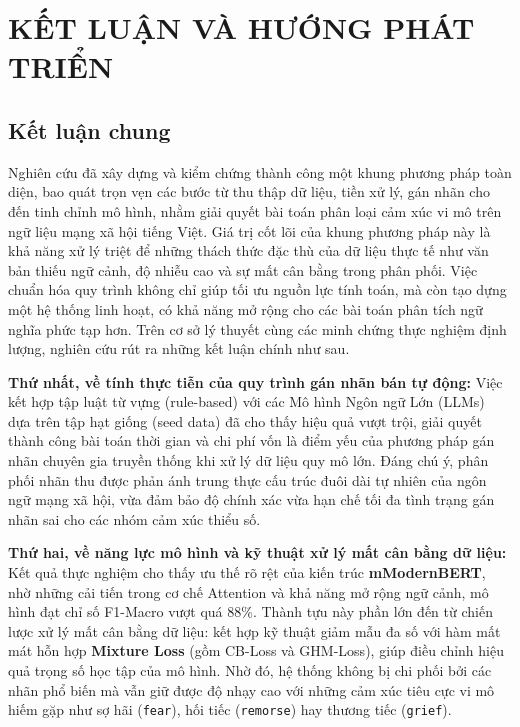 \chapter{KẾT LUẬN VÀ HƯỚNG PHÁT TRIỂN}
\label{Chapter5}

\section{Kết luận chung}
Nghiên cứu đã xây dựng và kiểm chứng thành công một khung phương pháp toàn diện, bao quát trọn vẹn các bước từ thu thập dữ liệu, tiền xử lý, gán nhãn cho đến tinh chỉnh mô hình, nhằm giải quyết bài toán phân loại cảm xúc vi mô trên ngữ liệu mạng xã hội tiếng Việt. Giá trị cốt lõi của khung phương pháp này là khả năng xử lý triệt để những thách thức đặc thù của dữ liệu thực tế như văn bản thiếu ngữ cảnh, độ nhiễu cao và sự mất cân bằng trong phân phối. Việc chuẩn hóa quy trình không chỉ giúp tối ưu nguồn lực tính toán, mà còn tạo dựng một hệ thống linh hoạt, có khả năng mở rộng cho các bài toán phân tích ngữ nghĩa phức tạp hơn. Trên cơ sở lý thuyết cùng các minh chứng thực nghiệm định lượng, nghiên cứu rút ra những kết luận chính như sau.

\textbf{Thứ nhất, về tính thực tiễn của quy trình gán nhãn bán tự động:} Việc kết hợp tập luật từ vựng (rule-based) với các Mô hình Ngôn ngữ Lớn (LLMs) dựa trên tập hạt giống (seed data) đã cho thấy hiệu quả vượt trội, giải quyết thành công bài toán thời gian và chi phí vốn là điểm yếu của phương pháp gán nhãn chuyên gia truyền thống khi xử lý dữ liệu quy mô lớn. Đáng chú ý, phân phối nhãn thu được phản ánh trung thực cấu trúc đuôi dài tự nhiên của ngôn ngữ mạng xã hội, vừa đảm bảo độ chính xác vừa hạn chế tối đa tình trạng gán nhãn sai cho các nhóm cảm xúc thiểu số.

\textbf{Thứ hai, về năng lực mô hình và kỹ thuật xử lý mất cân bằng dữ liệu:} Kết quả thực nghiệm cho thấy ưu thế rõ rệt của kiến trúc \textbf{mModernBERT}, nhờ những cải tiến trong cơ chế Attention và khả năng mở rộng ngữ cảnh, mô hình đạt chỉ số F1-Macro vượt quá $88\%$. Thành tựu này phần lớn đến từ chiến lược xử lý mất cân bằng dữ liệu: kết hợp kỹ thuật giảm mẫu đa số với hàm mất mát hỗn hợp \textbf{Mixture Loss} (gồm CB-Loss và GHM-Loss), giúp điều chỉnh hiệu quả trọng số học tập của mô hình. Nhờ đó, hệ thống không bị chi phối bởi các nhãn phổ biến mà vẫn giữ được độ nhạy cao với những cảm xúc tiêu cực vi mô hiếm gặp như sợ hãi (\texttt{fear}), hối tiếc (\texttt{remorse}) hay thương tiếc (\texttt{grief}).


